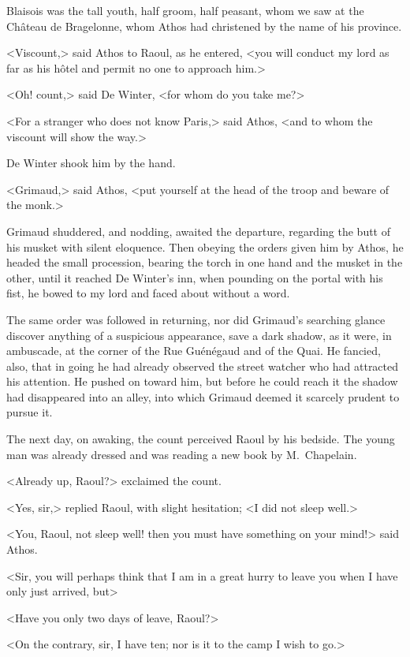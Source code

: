 Blaisois was the tall youth, half groom, half peasant, whom we saw at the Château de Bragelonne, whom Athos had christened by the name of his province.

<Viscount,> said Athos to Raoul, as he entered, <you will conduct my lord as far as his hôtel and permit no one to approach him.>

<Oh! count,> said De Winter, <for whom do you take me?>

<For a stranger who does not know Paris,> said Athos, <and to whom the viscount will show the way.>

De Winter shook him by the hand.

<Grimaud,> said Athos, <put yourself at the head of the troop and beware of the monk.>

Grimaud shuddered, and nodding, awaited the departure, regarding the butt of his musket with silent eloquence. Then obeying the orders given him by Athos, he headed the small procession, bearing the torch in one hand and the musket in the other, until it reached De Winter's inn, when pounding on the portal with his fist, he bowed to my lord and faced about without a word.

The same order was followed in returning, nor did Grimaud's searching glance discover anything of a suspicious appearance, save a dark shadow, as it were, in ambuscade, at the corner of the Rue Guénégaud and of the Quai. He fancied, also, that in going he had already observed the street watcher who had attracted his attention. He pushed on toward him, but before he could reach it the shadow had disappeared into an alley, into which Grimaud deemed it scarcely prudent to pursue it.

The next day, on awaking, the count perceived Raoul by his bedside. The young man was already dressed and was reading a new book by M.~Chapelain.

<Already up, Raoul?> exclaimed the count.

<Yes, sir,> replied Raoul, with slight hesitation; <I did not sleep well.>

<You, Raoul, not sleep well! then you must have something on your mind!> said Athos.

<Sir, you will perhaps think that I am in a great hurry to leave you when I have only just arrived, but\longdash>

<Have you only two days of leave, Raoul?>

<On the contrary, sir, I have ten; nor is it to the camp I wish to go.>

